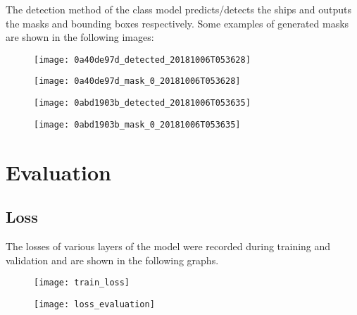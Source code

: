 The detection method of the class model predicts/detects the ships and outputs the masks and bounding boxes respectively. Some examples of generated masks are shown in the following images:
\begin{figure}[!htb]
\centering
\begin{minipage}{.5\textwidth}
  \centering
  \texttt{[image: 0a40de97d\_detected\_20181006T053628]}
  \label{fig:test1}
\end{minipage}%
\begin{minipage}{.5\textwidth}
  \centering
  \texttt{[image: 0a40de97d\_mask\_0\_20181006T053628]}
  \label{fig:test2}
\end{minipage}
\end{figure}

\begin{figure}[!htb]
\centering
\begin{minipage}{.5\textwidth}
  \centering
  \texttt{[image: 0abd1903b\_detected\_20181006T053635]}
  \label{fig:test1}
\end{minipage}%
\begin{minipage}{.5\textwidth}
  \centering
  \texttt{[image: 0abd1903b\_mask\_0\_20181006T053635]}
  \label{fig:test2}
\end{minipage}
\end{figure}

\section{Evaluation}
\label{sec:evaluation}

\subsection{Loss}
\label{subsec:loss}

The losses of various layers of the model were recorded during training and validation and are shown in the following graphs.

\begin{figure}[!htb]
\centering
\begin{minipage}{.5\textwidth}
  \centering
  \texttt{[image: train\_loss]}
  \label{fig:trainloss}
\end{minipage}%
\begin{minipage}{.5\textwidth}
  \centering
  \texttt{[image: loss\_evaluation]}
  \label{fig:evaluationloss}
\end{minipage}
\end{figure}

